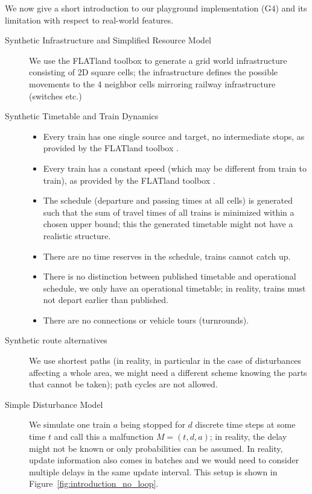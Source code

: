 \documentclass{article}
\begin{document}
We now give a short introduction to our playground implementation (G4) and its limitation with respect to real-world features.
\begin{description}
\item[Synthetic Infrastructure and Simplified Resource Model] We use the FLATland toolbox \cite{aicrowdFLATland} to generate a grid world infrastructure consisting of 2D square cells; the infrastructure defines the possible movements to the 4 neighbor cells mirroring railway infrastructure (switches etc.)
\item[Synthetic Timetable and Train Dynamics]
\begin{itemize}
    \item Every train has one single source and target, no intermediate stops, as provided by the FLATland toolbox \cite{aicrowdFLATland}.
    \item Every train has a constant speed (which may be different from train to train), as provided by the FLATland toolbox \cite{aicrowdFLATland}.
    \item The schedule (departure and passing times at all cells) is generated such that the sum of travel times of all trains is minimized within a chosen upper bound; this the generated timetable might not have a realistic structure.
    \item There are no time reserves in the schedule, trains cannot catch up.
    \item There is no distinction between published timetable and operational schedule, we only have an operational timetable; in reality, trains must not depart earlier than published.
    \item There are no connections or vehicle tours (turnrounds).
\end{itemize}
\item[Synthetic route alternatives] We use shortest paths (in reality, in particular in the case of disturbances affecting a whole area, we might need a different scheme knowing the parts that cannot be taken); path cycles are not allowed.
\item[Simple Disturbance Model] We simulate one train $a$ being stopped for $d$ discrete time steps at some time $t$ and call this a malfunction $M=(t,d, a)$; in reality, the delay might not be known or only probabilities can be assumed. In reality, update information also comes in batches and we would need to consider multiple delays in the same update interval. This setup is shown in Figure~\ref{fig:introduction_no_loop}.
\end{description}
\end{document}
